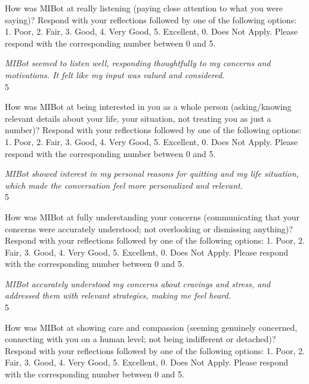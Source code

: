\begin{researcherbox}
How was MIBot at really listening (paying close attention to what you were saying)? Respond with your reflections followed by one of the following options: 1. Poor, 2. Fair, 3. Good, 4. Very Good, 5. Excellent, 0. Does Not Apply. Please respond with the corresponding number between 0 and 5.
\end{researcherbox}

\begin{clientbox}
\textit{MIBot seemed to listen well, responding thoughtfully to my concerns and motivations. It felt like my input was valued and considered.} \\
5
\end{clientbox}

\begin{researcherbox}
How was MIBot at being interested in you as a whole person (asking/knowing relevant details about your life, your situation, not treating you as just a number)? Respond with your reflections followed by one of the following options: 1. Poor, 2. Fair, 3. Good, 4. Very Good, 5. Excellent, 0. Does Not Apply. Please respond with the corresponding number between 0 and 5.
\end{researcherbox}

\begin{clientbox}
\textit{MIBot showed interest in my personal reasons for quitting and my life situation, which made the conversation feel more personalized and relevant.} \\
5
\end{clientbox}

\begin{researcherbox}
How was MIBot at fully understanding your concerns (communicating that your concerns were accurately understood; not overlooking or dismissing anything)? Respond with your reflections followed by one of the following options: 1. Poor, 2. Fair, 3. Good, 4. Very Good, 5. Excellent, 0. Does Not Apply. Please respond with the corresponding number between 0 and 5.
\end{researcherbox}

\begin{clientbox}
\textit{MIBot accurately understood my concerns about cravings and stress, and addressed them with relevant strategies, making me feel heard.} \\
5
\end{clientbox}

\begin{researcherbox}
How was MIBot at showing care and compassion (seeming genuinely concerned, connecting with you on a human level; not being indifferent or detached)? Respond with your reflections followed by one of the following options: 1. Poor, 2. Fair, 3. Good, 4. Very Good, 5. Excellent, 0. Does Not Apply. Please respond with the corresponding number between 0 and 5.
\end{researcherbox}

